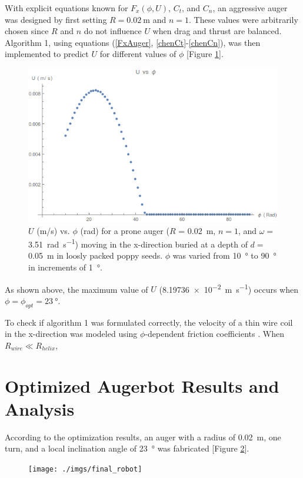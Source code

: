 \documentclass[letterpaper, 11 pt]{article}
\begin{document}
With explicit equations known for $F_x(\phi,U)$, $C_t$, and $C_n$, an aggressive auger was designed by first setting $R = \SI{0.02}{\m}$ and $n = 1$. These values were arbitrarily chosen since $R$ and $n$ do not influence $U$ when drag and thrust are balanced. Algorithm 1, using equations (\ref{FxAuger}, \ref{chenCt}-\ref{chenCn}), was then implemented to predict $U$ for different values of $\phi$ [Figure \ref{fig:UvPhi}].  
\begin{figure}[H]
\centering
\includegraphics[width=0.7\linewidth]{./imgs/UvPhi}
\caption{$U$ (\si{\m/\s}) vs. $\phi$ (\si{\radian}) for a prone auger ($R$ = \SI{0.02}{\m}, $n = 1$, and $\omega = $ \SI[per-mode=fraction]{3.51}{\radian\per\s}) moving in the x-direction buried at a depth of $d =$ \SI{0.05}{\m} in loosly packed poppy seeds. $\phi$ was varied from \SI{10}{\degree} to \SI{90}{\degree} in increments of \SI{1}{\degree}.}
\label{fig:UvPhi}
\end{figure}
As shown above, the maximum value of $U$ (\SI[per-mode=fraction]{8.19736e-2}{\m\per\s}) occurs when $\phi = \phi_{opt} = \SI{23}{\degree}$. 
 
To check if algorithm 1 was formulated correctly, the velocity of a thin wire coil in the x-direction was modeled using $\phi$-dependent friction coefficients \cite{Chen}. When $R_{wire} \ll R_{helix}$, 
 

\section{Optimized Augerbot Results and Analysis}
According to the optimization results, an auger with a radius of \SI{0.02}{\m}, one turn, and a local inclination angle of \SI{23}{\degree} was fabricated [Figure \ref{fig:final_robot}]. 

\begin{figure}[H]
\centering
\texttt{[image: ./imgs/final\_robot]}
\caption{}
\label{fig:final_robot}
\end{figure} 
\end{document}
